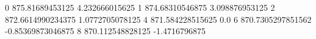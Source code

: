 0 875.81689453125 4.232666015625
1 874.68310546875 3.098876953125
2 872.6614990234375 1.0772705078125
4 871.584228515625 0.0
6 870.7305297851562 -0.85369873046875
8 870.112548828125 -1.4716796875
